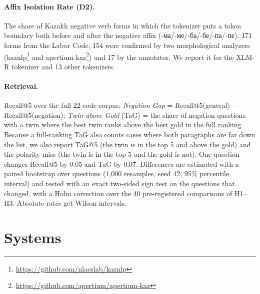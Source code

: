 \documentclass[11pt]{article}
\newcommand{\ru}[1]{#1}
\begin{document}
\paragraph{Affix Isolation Rate (D2).} The share of Kazakh negative verb forms in which the tokenizer puts a
token boundary both before and after the negative affix (\ru{-ма/-ме/-ба/-бе/-па/-пе}). 171 forms from the
Labor Code; 154 were confirmed by two morphological analyzers (kaznlp\footnote{\url{https://github.com/nlacslab/kaznlp}}
and apertium-kaz\footnote{\url{https://github.com/apertium/apertium-kaz}}) and 17 by the annotator. We report it for
the XLM-R tokenizer \citep{conneau-etal-2020-unsupervised} and 13 other tokenizers.

\paragraph{Retrieval.} Recall@5 over the full 22-code corpus; \emph{Negation Gap} = Recall@5(general) $-$
Recall@5(negation); \emph{Twin-above-Gold} (TaG) = the share of negation questions with a twin where the best
twin ranks above the best gold in the full ranking. Because a full-ranking TaG also counts cases where both
paragraphs are far down the list, we also report TaG@5 (the twin is in the top 5 and above the gold) and the
polarity miss (the twin is in the top 5 and the gold is not). One question changes Recall@5 by 0.05 and TaG by
0.07. Differences are estimated with a paired bootstrap over questions (1,000 resamples, seed 42, 95\%
percentile interval) and tested with an exact two-sided sign test on the questions that changed, with a Holm
correction over the 40 pre-registered comparisons of H1--H3. Absolute rates get Wilson intervals.

\section{Systems}
\end{document}

